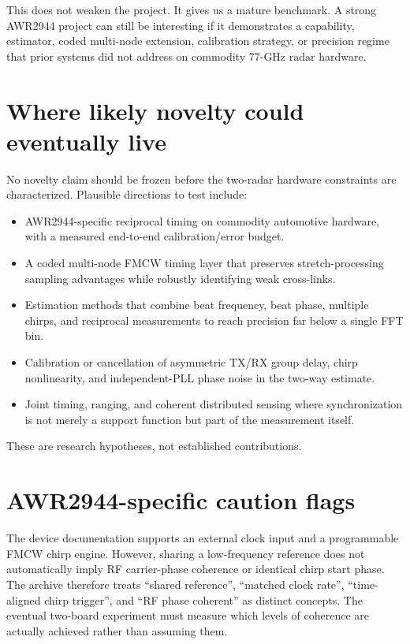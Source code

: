 \documentclass[11pt]{article}
\begin{document}
This does not weaken the project. It gives us a mature benchmark. A strong AWR2944 project can still be interesting if it demonstrates a capability, estimator, coded multi-node extension, calibration strategy, or precision regime that prior systems did not address on commodity 77-GHz radar hardware.

\section{Where likely novelty could eventually live}
No novelty claim should be frozen before the two-radar hardware constraints are characterized. Plausible directions to test include:
\begin{itemize}
\item AWR2944-specific reciprocal timing on commodity automotive hardware, with a measured end-to-end calibration/error budget.
\item A coded multi-node FMCW timing layer that preserves stretch-processing sampling advantages while robustly identifying weak cross-links.
\item Estimation methods that combine beat frequency, beat phase, multiple chirps, and reciprocal measurements to reach precision far below a single FFT bin.
\item Calibration or cancellation of asymmetric TX/RX group delay, chirp nonlinearity, and independent-PLL phase noise in the two-way estimate.
\item Joint timing, ranging, and coherent distributed sensing where synchronization is not merely a support function but part of the measurement itself.
\end{itemize}
These are research hypotheses, not established contributions.

\section{AWR2944-specific caution flags}
The device documentation supports an external clock input and a programmable FMCW chirp engine. However, sharing a low-frequency reference does not automatically imply RF carrier-phase coherence or identical chirp start phase. The archive therefore treats ``shared reference'', ``matched clock rate'', ``time-aligned chirp trigger'', and ``RF phase coherent'' as distinct concepts. The eventual two-board experiment must measure which levels of coherence are actually achieved rather than assuming them.
\end{document}
